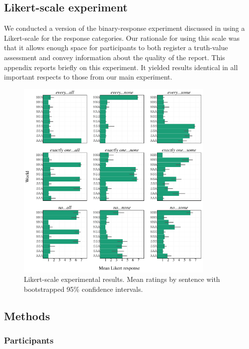 \documentclass[leqno,12pt]{article}
\begin{document}
\begin{appendix}

\section{Likert-scale experiment}\label{app:likert}

We conducted a version of the binary-response experiment discussed in
 using a Likert-scale for the response categories.
Our rationale for using this scale was that it allows enough space for
participants to both register a truth-value assessment and convey
information about the quality of the report. This appendix reports
briefly on this experiment. It yielded results identical in all
important respects to those from our main experiment.

\begin{figure}[t]
  \centering
  \includegraphics[width=0.85\textwidth]{fig/embeddedscalars-experiment-results-likert}
  \caption{Likert-scale experimental results. Mean ratings by sentence with bootstrapped 95\% confidence intervals.}
  \label{fig:likert:results}
\end{figure}

\subsection{Methods}

\subsubsection{Participants}


\end{appendix}
\end{document}
